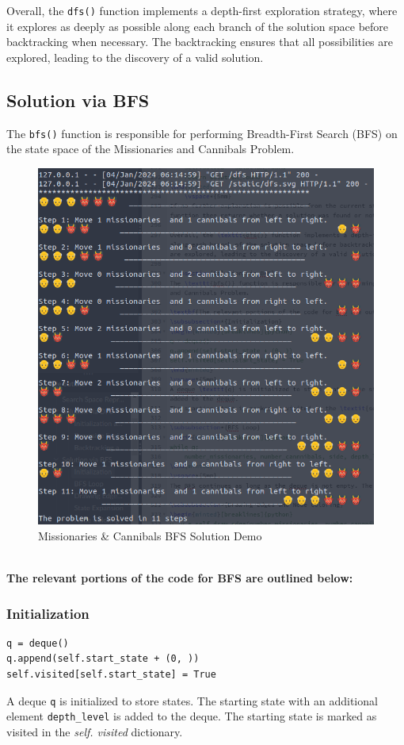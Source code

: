 \documentclass[12pt]{article}
\begin{document}
Overall, the \texttt{dfs()} function implements a depth-first exploration strategy, where it explores as deeply as possible along each branch of the solution space before backtracking when necessary. The backtracking ensures that all possibilities are explored, leading to the discovery of a valid solution.

\clearpage
\subsection{Solution via BFS}
The \texttt{bfs()} function is responsible for performing Breadth-First Search (BFS) on the state space of the Missionaries and Cannibals Problem. 
\begin{figure}[h]
  \centerline{\includegraphics[width = 150mm]{MnC_BFS_demo.png}}
  \caption{Missionaries & Cannibals BFS Solution Demo}
  \label{fig}
\end{figure}

\\
\textbf{The relevant portions of the code for BFS are outlined below:}
\subsubsection*{Initialization}
\begin{verbatim}
q = deque()
q.append(self.start_state + (0, ))
self.visited[self.start_state] = True
\end{verbatim}
\vspace*{5mm}
A deque \texttt{q} is initialized to store states. The starting state with an additional element \texttt{depth\_level} is added to the deque.
The starting state is marked as visited in the \textit{self. visited} dictionary.
\end{document}
